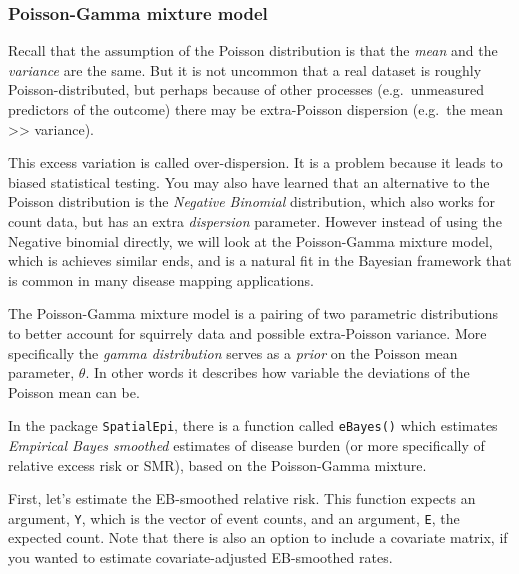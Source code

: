 \documentclass[
]{book}
\newenvironment{Shaded}{\begin{snugshade}}{\end{snugshade}}
\newcommand{\CommentTok}[1]{\textcolor[rgb]{0.56,0.35,0.01}{\textit{#1}}}
\newcommand{\FunctionTok}[1]{\textcolor[rgb]{0.13,0.29,0.53}{\textbf{#1}}}
\newcommand{\NormalTok}[1]{#1}
\newcommand{\OtherTok}[1]{\textcolor[rgb]{0.56,0.35,0.01}{#1}}
\newcommand{\SpecialCharTok}[1]{\textcolor[rgb]{0.81,0.36,0.00}{\textbf{#1}}}
\begin{document}
\hypertarget{poisson-gamma-mixture-model}{%
\subsubsection{Poisson-Gamma mixture model}\label{poisson-gamma-mixture-model}}

Recall that the assumption of the Poisson distribution is that the \emph{mean} and the \emph{variance} are the same. But it is not uncommon that a real dataset is roughly Poisson-distributed, but perhaps because of other processes (e.g.~unmeasured predictors of the outcome) there may be extra-Poisson dispersion (e.g.~the mean \textgreater\textgreater{} variance).

This excess variation is called over-dispersion. It is a problem because it leads to biased statistical testing. You may also have learned that an alternative to the Poisson distribution is the \emph{Negative Binomial} distribution, which also works for count data, but has an extra \emph{dispersion} parameter. However instead of using the Negative binomial directly, we will look at the Poisson-Gamma mixture model, which is achieves similar ends, and is a natural fit in the Bayesian framework that is common in many disease mapping applications.

The Poisson-Gamma mixture model is a pairing of two parametric distributions to better account for squirrely data and possible extra-Poisson variance. More specifically the \emph{gamma distribution} serves as a \emph{prior} on the Poisson mean parameter, \(\theta\). In other words it describes how variable the deviations of the Poisson mean can be.

In the package \texttt{SpatialEpi}, there is a function called \texttt{eBayes()} which estimates \emph{Empirical Bayes smoothed} estimates of disease burden (or more specifically of relative excess risk or SMR), based on the Poisson-Gamma mixture.

First, let's estimate the EB-smoothed relative risk. This function expects an argument, \texttt{Y}, which is the vector of event counts, and an argument, \texttt{E}, the expected count. Note that there is also an option to include a covariate matrix, if you wanted to estimate covariate-adjusted EB-smoothed rates.

\begin{Shaded}
\end{Shaded}
\end{document}
